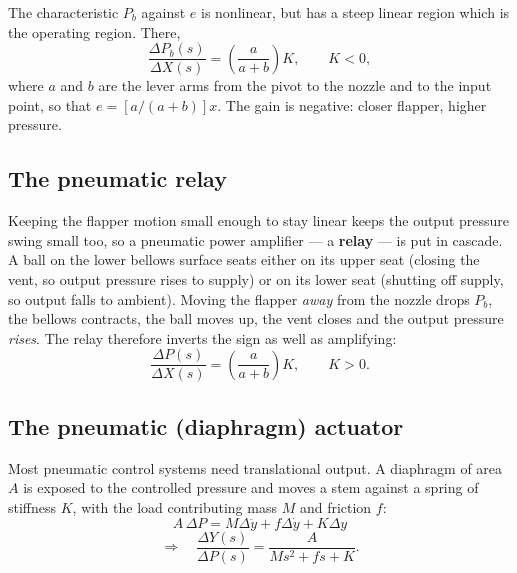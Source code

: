 \documentclass[11pt,a4paper]{article}
\begin{document}
The characteristic $P_b$ against $e$ is nonlinear, but has a steep linear
region which is the operating region. There,
\begin{equation}
  \frac{\Delta P_b(s)}{\Delta X(s)}=\left(\frac{a}{a+b}\right)K,
  \qquad K<0,
  \label{eq:flapper}
\end{equation}
where $a$ and $b$ are the lever arms from the pivot to the nozzle and to the
input point, so that $e=[a/(a+b)]x$. The gain is negative: closer flapper,
higher pressure.

\subsection{The pneumatic relay}

Keeping the flapper motion small enough to stay linear keeps the output
pressure swing small too, so a pneumatic power amplifier --- a \textbf{relay}
--- is put in cascade. A ball on the lower bellows surface seats either on its
upper seat (closing the vent, so output pressure rises to supply) or on its
lower seat (shutting off supply, so output falls to ambient). Moving the
flapper \emph{away} from the nozzle drops $P_b$, the bellows contracts, the
ball moves up, the vent closes and the output pressure \emph{rises}. The relay
therefore inverts the sign as well as amplifying:
\begin{equation}
  \frac{\Delta P(s)}{\Delta X(s)}=\left(\frac{a}{a+b}\right)K,\qquad K>0 .
  \label{eq:relay}
\end{equation}

\subsection{The pneumatic (diaphragm) actuator}

Most pneumatic control systems need translational output. A diaphragm of area
$A$ is exposed to the controlled pressure and moves a stem against a spring of
stiffness $K$, with the load contributing mass $M$ and friction $f$:
\[
  A\,\Delta P = M\Delta\ddot y+f\Delta\dot y+K\Delta y
\]
\begin{equation}
  \Longrightarrow\quad
  \frac{\Delta Y(s)}{\Delta P(s)}=\frac{A}{Ms^2+fs+K}.
  \label{eq:pneuact}
\end{equation}
\end{document}
